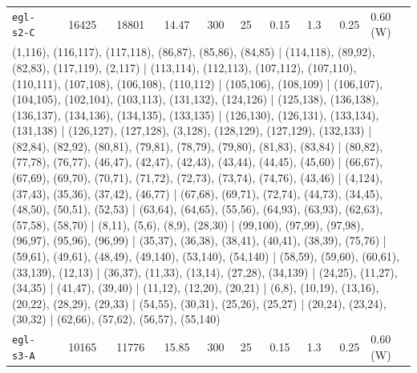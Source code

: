 \begin{longtable}{lrrrrrrrrl}
\texttt{egl-s2-C} & 16425 & 18801 & 14.47 & 300 & 25 & 0.15 & 1.3 & 0.25 & 0.60\,(W) \\
\multicolumn{10}{p{0.96\linewidth}}{\tiny\raggedright\arraybackslash (1,116), (116,117), (117,118), (86,87), (85,86), (84,85) | (114,118), (89,92), (82,83), (117,119), (2,117) | (113,114), (112,113), (107,112), (107,110), (110,111), (107,108), (106,108), (110,112) | (105,106), (108,109) | (106,107), (104,105), (102,104), (103,113), (131,132), (124,126) | (125,138), (136,138), (136,137), (134,136), (134,135), (133,135) | (126,130), (126,131), (133,134), (131,138) | (126,127), (127,128), (3,128), (128,129), (127,129), (132,133) | (82,84), (82,92), (80,81), (79,81), (78,79), (79,80), (81,83), (83,84) | (80,82), (77,78), (76,77), (46,47), (42,47), (42,43), (43,44), (44,45), (45,60) | (66,67), (67,69), (69,70), (70,71), (71,72), (72,73), (73,74), (74,76), (43,46) | (4,124), (37,43), (35,36), (37,42), (46,77) | (67,68), (69,71), (72,74), (44,73), (34,45), (48,50), (50,51), (52,53) | (63,64), (64,65), (55,56), (64,93), (63,93), (62,63), (57,58), (58,70) | (8,11), (5,6), (8,9), (28,30) | (99,100), (97,99), (97,98), (96,97), (95,96), (96,99) | (35,37), (36,38), (38,41), (40,41), (38,39), (75,76) | (59,61), (49,61), (48,49), (49,140), (53,140), (54,140) | (58,59), (59,60), (60,61), (33,139), (12,13) | (36,37), (11,33), (13,14), (27,28), (34,139) | (24,25), (11,27), (34,35) | (41,47), (39,40) | (11,12), (12,20), (20,21) | (6,8), (10,19), (13,16), (20,22), (28,29), (29,33) | (54,55), (30,31), (25,26), (25,27) | (20,24), (23,24), (30,32) | (62,66), (57,62), (56,57), (55,140)} \\[2pt]
\texttt{egl-s3-A} & 10165 & 11776 & 15.85 & 300 & 25 & 0.15 & 1.3 & 0.25 & 0.60\,(W) \\

\end{longtable}
